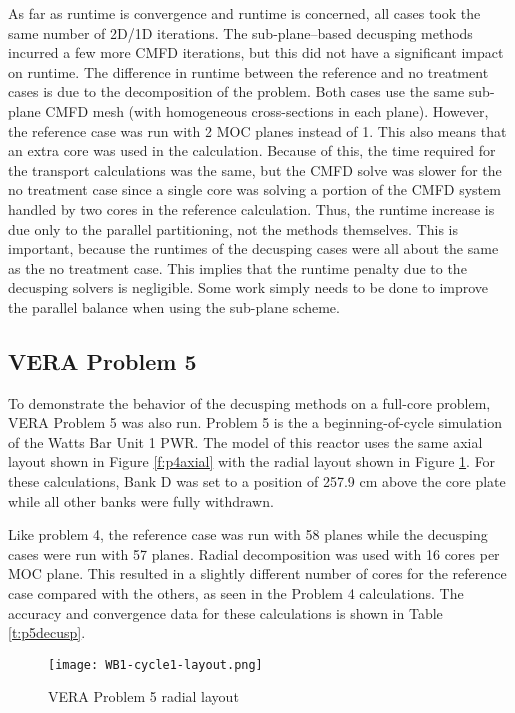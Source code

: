 As far as runtime is convergence and runtime is concerned, all cases took the same number of 2D/1D iterations.  The sub-plane--based decusping methods incurred a few more CMFD iterations, but this did not have a significant impact on runtime.  The difference in runtime between the reference and no treatment cases is due to the decomposition of the problem.  Both cases use the same sub-plane CMFD mesh (with homogeneous cross-sections in each plane).  However, the reference case was run with 2 MOC planes instead of 1.  This also means that an extra core was used in the calculation.  Because of this, the time required for the transport calculations was the same, but the CMFD solve was slower for the no treatment case since a single core was solving a portion of the CMFD system handled by two cores in the reference calculation.  Thus, the runtime increase is due only to the parallel partitioning, not the methods themselves.  This is important, because the runtimes of the decusping cases were all about the same as the no treatment case.  This implies that the runtime penalty due to the decusping solvers is negligible.  Some work simply needs to be done to improve the parallel balance when using the sub-plane scheme.

\subsection{VERA Problem 5}

To demonstrate the behavior of the decusping methods on a full-core problem, VERA Problem 5 was also run.  Problem 5 is the a beginning-of-cycle simulation of the Watts Bar Unit 1 PWR.  The model of this reactor uses the same axial layout shown in Figure \ref{f:p4axial} with the radial layout shown in Figure \ref{f:p5radial}.  For these calculations, Bank D was set to a position of 257.9 cm above the core plate while all other banks were fully withdrawn.

Like problem 4, the reference case was run with 58 planes while the decusping cases were run with 57 planes.  Radial decomposition was used with 16 cores per MOC plane.  This resulted in a slightly different number of cores for the reference case compared with the others, as seen in the Problem 4 calculations.  The accuracy and convergence data for these calculations is shown in Table \ref{t:p5decusp}.

\begin{figure}[h]
\centering
\texttt{[image: WB1-cycle1-layout.png]}
\caption{VERA Problem 5 radial layout}\label{f:p5radial}
\end{figure}

